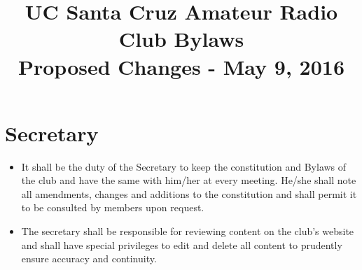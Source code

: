 \documentclass{article}
\begin{document}
\title{UC Santa Cruz Amateur Radio Club Bylaws \\ \small{Proposed Changes - May 9, 2016}}
\author{}
\date{}
\maketitle

\tableofcontents

\pagebreak

\section{Secretary}
\begin{itemize}
\item It shall be the duty of the Secretary to keep the constitution and Bylaws of the club and have the same with him/her at every meeting. He/she shall note all amendments, changes and additions to the constitution and shall permit it to be consulted by members upon request.

\item The secretary shall be responsible for reviewing content on the club's website and shall have special privileges to edit and delete all content to prudently ensure accuracy and continuity. 

\end{itemize}
\end{document}
